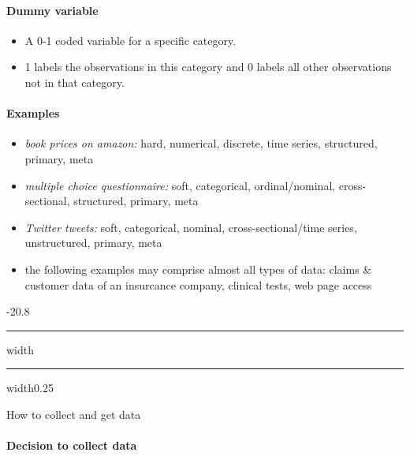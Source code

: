 \documentclass[a4paper, landscape, 6pt, fleqn]{scrartcl}
\makeatletter
\renewcommand{\subsection}{\@startsection{subsection}{1}{0mm}%
{-2\baselineskip}{0.8\baselineskip}%
{\hrule depth 0.2pt width\columnwidth\hrule depth0.75pt
width0.25\columnwidth\vspace*{1.2em}\large\bfseries}}
\makeatother
\begin{document}
\begin{multicols*}{4}
\paragraph{Dummy variable}

\begin{itemize}
\item A 0-1 coded variable for a specific category.
\item 1 labels the observations in this category and 0 labels all other observations not in that category.
\end{itemize}

\paragraph{Examples}

\begin{itemize}
\item \textit{book prices on amazon:} hard, numerical, discrete, time series, structured, primary, meta
\item \textit{multiple choice questionnaire:} soft, categorical, ordinal/nominal, cross-sectional, structured, primary, meta
\item \textit{Twitter tweets:} soft, categorical, nominal, cross-sectional/time series, unstructured, primary, meta
\item the following examples may comprise almost all types of data: claims \& customer data of an insurcance company, clinical tests, web page access
\end{itemize}

\subsection{How to collect and get data}

\paragraph{Decision to collect data}


\end{multicols*}
\end{document}
